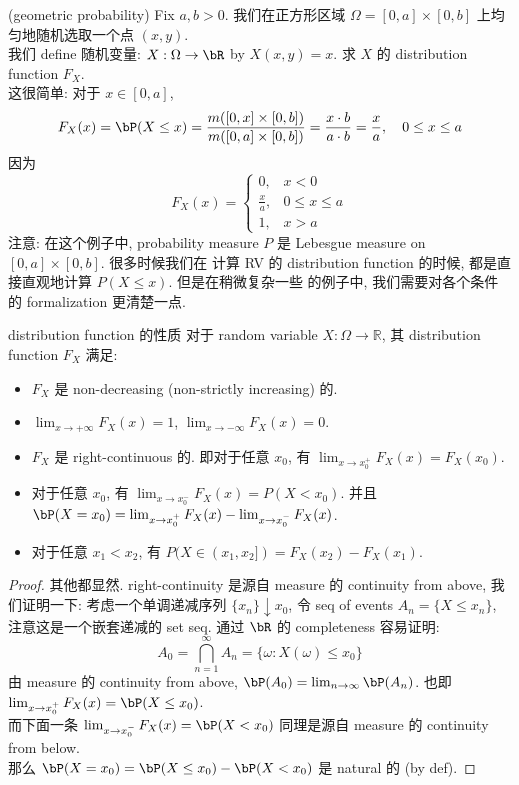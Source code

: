 \begin{example}{(geometric probability)}
Fix \(a,b >0\). 
我们在正方形区域 \(\Omega = [0,a] \times [0,b]\) 上均匀地随机选取一个点 \((x,y)\).\\
我们 define 随机变量: \(X: \Omega \to \bR\) by \(X(x,y) = x\). 求 \(X\) 的 distribution function \(F_X\).\\
这很简单: 对于 \(x\in [0,a]\),
\[
F_X(x) = \bP(X \leq x) = \frac{m([0,x]\times [0,b])}{m([0,a]\times [0,b])} = 
\frac{x \cdot b}{a \cdot b} = \frac{x}{a}, \quad 0 \le x \le a
\]
因为
\begin{equation}
    F_X(x) = \begin{cases}
    0, & x < 0 \\
    \frac{x}{a}, & 0 \le x \le a \\
    1, & x > a
    \end{cases}
\end{equation}
注意: 在这个例子中, probability measure \(P\) 是 Lebesgue measure on \([0,a]\times [0,b]\). 很多时候我们在
计算 RV 的 distribution function 的时候, 都是直接直观地计算 \(P(X \leq x)\). 但是在稍微复杂一些
的例子中, 我们需要对各个条件的 formalization 更清楚一点.
\end{example}


\begin{theorem}{distribution function 的性质}\label{distribution function 的性质}
    对于 random variable \(X: \Omega \to \mathbb{R}\), 其 distribution function \(F_X\) 满足:
    \begin{itemize}
        \item \(F_X\) 是 non-decreasing (non-strictly increasing) 的.
        \item $\lim _{x \rightarrow+\infty} F_X(x)=1$, $\lim _{x \rightarrow-\infty} F_X(x)=0$.
        \item \(F_X\) 是 right-continuous 的. 即对于任意 \(x_0\), 有 \(\lim_{x \to x_0^+} F_X(x) = F_X(x_0)\).
        \item 对于任意 \(x_0\), 有 \(\lim_{x \to x_0^-} F_X(x) = P(X < x_0)\). 
        并且 \(\bP(X = x_0) = \lim_{x \to x_0^+} F_X(x) - \lim_{x \to x_0^-} F_X(x)\).
        \item 对于任意 \(x_1 < x_2\), 有 \(P(X \in (x_1,x_2]) = F_X(x_2) - F_X(x_1)\).
    \end{itemize}
\end{theorem}
\begin{proof}
    其他都显然. right-continuity 是源自 measure 的 continuity from above, 
    我们证明一下: 考虑一个单调递减序列 $\{x_n\}\downarrow x_0$, 
    令 seq of events \(A_n = \{X \leq x_n\}\), 注意这是一个嵌套递减的 set seq. 
    通过 \(\bR\) 的 completeness 容易证明:  \[A_0 = \bigcap_{n=1}^\infty A_n = \{\omega: X(\omega) \leq x_0\}\]
    由 measure 的 continuity from above, \(\bP(A_0) = \lim_{n\to\infty} \bP(A_n)\).
    也即 \(\lim_{x \to x_0^+} F_X(x) = \bP(X \leq x_0)\).\\
    而下面一条 \(\lim_{x \to x_0^-} F_X(x) = \bP(X < x_0)\) 同理是源自 measure 的
     continuity from below.\\
    那么 \(\bP(X = x_0) = \bP(X \leq x_0) - \bP(X < x_0)\) 是 natural 的 (by def).
\end{proof}


